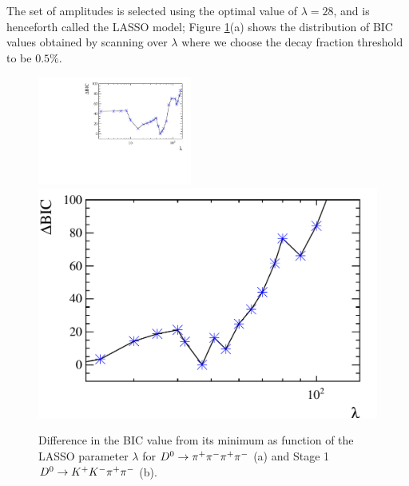 The set of amplitudes is selected using the optimal value of $\lambda=28$, and is henceforth called the LASSO model; 
Figure \ref{fig:BIC}(a) shows the distribution of BIC values obtained by scanning over $\lambda$
where we choose the decay fraction threshold to be $0.5 \%$.

\begin{figure}[b]
  \centering
  \includegraphics[width=0.45\textwidth, height=!]{figs/lassoFit/Lasso_BIC.pdf} 
  \includegraphics[width=0.45\linewidth, height=!]{figs/fullFit/ReLasso_BIC.pdf}
  \caption{Difference in the BIC value from its minimum as function of the LASSO parameter $\lambda$ for ${{D}^0} \rightarrow \pi^+\pi^-\pi^+\pi^-$ (a) and Stage 1 ${{D}^0} \rightarrow K^+K^-\pi^+\pi^-$ (b).}
  \label{fig:BIC}
\end{figure}


